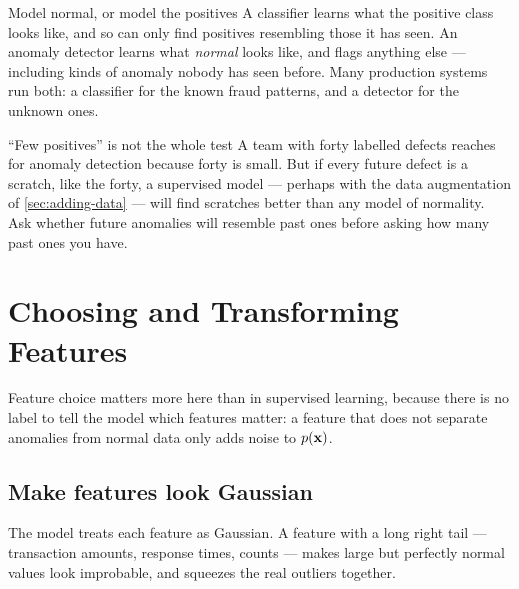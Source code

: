 \begin{keyinsight}{Model normal, or model the positives}
A classifier learns what the positive class looks like, and so can only find
positives resembling those it has seen. An anomaly detector learns what
\emph{normal} looks like, and flags anything else --- including kinds of anomaly
nobody has seen before. Many production systems run both: a classifier for the
known fraud patterns, and a detector for the unknown ones.
\end{keyinsight}

\begin{pitfall}{``Few positives'' is not the whole test}
A team with forty labelled defects reaches for anomaly detection because forty
is small. But if every future defect is a scratch, like the forty, a supervised
model --- perhaps with the data augmentation of \cref{sec:adding-data} --- will
find scratches better than any model of normality. Ask whether future anomalies
will resemble past ones before asking how many past ones you have.
\end{pitfall}

\section{Choosing and Transforming Features}
\label{sec:ad-features}

Feature choice matters more here than in supervised learning, because there is no
label to tell the model which features matter: a feature that does not separate
anomalies from normal data only adds noise to $p(\mathbf{x})$.

\subsection{Make features look Gaussian}

The model treats each feature as Gaussian. A feature with a long right tail ---
transaction amounts, response times, counts --- makes large but perfectly normal
values look improbable, and squeezes the real outliers together.

